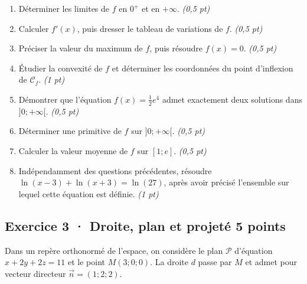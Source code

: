 \begin{enumerate}

\item Déterminer les limites de $f$ en $0^+$ et en $+\infty$. \hfill\textit{(0{,}5 pt)}

\item Calculer $f' (x)$, puis dresser le tableau de variations de $f$. \hfill\textit{(0{,}5 pt)}

\item Préciser la valeur du maximum de $f$, puis résoudre $f(x)=0$. \hfill\textit{(0{,}5 pt)}

\item Étudier la convexité de $f$ et déterminer les coordonnées du point d'inflexion de $\mathcal C_f$. \hfill\textit{(1 pt)}

\item Démontrer que l'équation $f(x)=\frac12 e^{4}$ admet exactement deux solutions dans $]0;+\infty[$. \hfill\textit{(0{,}5 pt)}

\item Déterminer une primitive de $f$ sur $]0;+\infty[$. \hfill\textit{(0{,}5 pt)}

\item Calculer la valeur moyenne de $f$ sur $[1;e]$. \hfill\textit{(0{,}5 pt)}

\item Indépendamment des questions précédentes, résoudre $\ln(x-3)+\ln(x+3)=\ln(27)$, après avoir précisé l'ensemble sur lequel cette équation est définie. \hfill\textit{(1 pt)}

\end{enumerate}

\mxnewpage{}\par

\subsection*{Exercice 3 · Droite, plan et projeté \hfill 5 points}Dans un repère orthonormé de l'espace, on considère le plan $\mathcal P$ d'équation $x+2y+2z=11$ et le point $M(3;0;0)$. La droite $d$ passe par $M$ et admet pour vecteur directeur $\vec n=(1;2;2)$.

